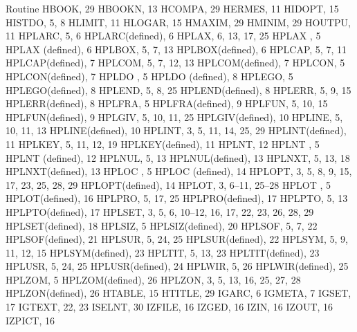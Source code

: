 \begin{theindex}
  \item Routine
    \subitem HBOOK, 29
    \subitem HBOOKN, 13
    \subitem HCOMPA, 29
    \subitem HERMES, 11
    \subitem HIDOPT, 15
    \subitem HISTDO, 5, 8
    \subitem HLIMIT, 11
    \subitem HLOGAR, 15
    \subitem HMAXIM, 29
    \subitem HMINIM, 29
    \subitem HOUTPU, 11
    \subitem HPLARC, 5, 6
    \subitem HPLARC(defined), 6
    \subitem HPLAX, 6, 13, 17, 25
    \subitem HPLAX , 5
    \subitem HPLAX (defined), 6
    \subitem HPLBOX, 5, 7, 13
    \subitem HPLBOX(defined), 6
    \subitem HPLCAP, 5, 7, 11
    \subitem HPLCAP(defined), 7
    \subitem HPLCOM, 5, 7, 12, 13
    \subitem HPLCOM(defined), 7
    \subitem HPLCON, 5
    \subitem HPLCON(defined), 7
    \subitem HPLDO , 5
    \subitem HPLDO (defined), 8
    \subitem HPLEGO, 5
    \subitem HPLEGO(defined), 8
    \subitem HPLEND, 5, 8, 25
    \subitem HPLEND(defined), 8
    \subitem HPLERR, 5, 9, 15
    \subitem HPLERR(defined), 8
    \subitem HPLFRA, 5
    \subitem HPLFRA(defined), 9
    \subitem HPLFUN, 5, 10, 15
    \subitem HPLFUN(defined), 9
    \subitem HPLGIV, 5, 10, 11, 25
    \subitem HPLGIV(defined), 10
    \subitem HPLINE, 5, 10, 11, 13
    \subitem HPLINE(defined), 10
    \subitem HPLINT, 3, 5, 11, 14, 25, 29
    \subitem HPLINT(defined), 11
    \subitem HPLKEY, 5, 11, 12, 19
    \subitem HPLKEY(defined), 11
    \subitem HPLNT, 12
    \subitem HPLNT , 5
    \subitem HPLNT (defined), 12
    \subitem HPLNUL, 5, 13
    \subitem HPLNUL(defined), 13
    \subitem HPLNXT, 5, 13, 18
    \subitem HPLNXT(defined), 13
    \subitem HPLOC , 5
    \subitem HPLOC (defined), 14
    \subitem HPLOPT, 3, 5, 8, 9, 15, 17, 23, 25, 28, 29
    \subitem HPLOPT(defined), 14
    \subitem HPLOT, 3, 6--11, 25--28
    \subitem HPLOT , 5
    \subitem HPLOT(defined), 16
    \subitem HPLPRO, 5, 17, 25
    \subitem HPLPRO(defined), 17
    \subitem HPLPTO, 5, 13
    \subitem HPLPTO(defined), 17
    \subitem HPLSET, 3, 5, 6, 10--12, 16, 17, 22, 23, 26, 28, 29
    \subitem HPLSET(defined), 18
    \subitem HPLSIZ, 5
    \subitem HPLSIZ(defined), 20
    \subitem HPLSOF, 5, 7, 22
    \subitem HPLSOF(defined), 21
    \subitem HPLSUR, 5, 24, 25
    \subitem HPLSUR(defined), 22
    \subitem HPLSYM, 5, 9, 11, 12, 15
    \subitem HPLSYM(defined), 23
    \subitem HPLTIT, 5, 13, 23
    \subitem HPLTIT(defined), 23
    \subitem HPLUSR, 5, 24, 25
    \subitem HPLUSR(defined), 24
    \subitem HPLWIR, 5, 26
    \subitem HPLWIR(defined), 25
    \subitem HPLZOM, 5
    \subitem HPLZOM(defined), 26
    \subitem HPLZON, 3, 5, 13, 16, 25, 27, 28
    \subitem HPLZON(defined), 26
    \subitem HTABLE, 15
    \subitem HTITLE, 29
    \subitem IGARC, 6
    \subitem IGMETA, 7
    \subitem IGSET, 17
    \subitem IGTEXT, 22, 23
    \subitem ISELNT, 30
    \subitem IZFILE, 16
    \subitem IZGED, 16
    \subitem IZIN, 16
    \subitem IZOUT, 16
    \subitem IZPICT, 16
 

\end{theindex}
